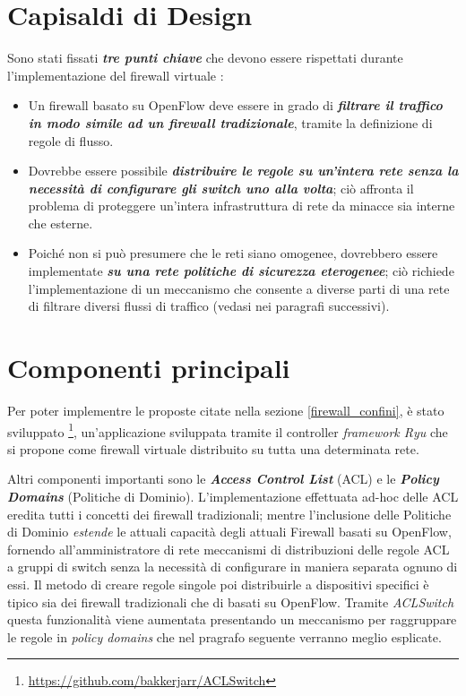 \onehalfspacing

\section{Capisaldi di Design}
Sono stati fissati \textit{\textbf{tre punti chiave}} che devono essere rispettati durante l'implementazione del firewall virtuale \cite{bakker2016network}:
\begin{itemize}
  \item Un firewall basato su OpenFlow deve essere in grado di \textit{\textbf{filtrare il traffico in modo simile ad un firewall tradizionale}}, tramite la definizione di regole di flusso.
  \item Dovrebbe essere possibile \textit{\textbf{distribuire le regole su un'intera rete senza la necessità di configurare gli switch uno alla volta}}; ciò affronta il problema di proteggere un'intera infrastruttura di rete da minacce sia interne che esterne.
  \item Poiché non si può presumere che le reti siano omogenee, dovrebbero essere implementate \textit{\textbf{su una rete politiche di sicurezza eterogenee}}; ciò richiede l'implementazione di un meccanismo che consente a diverse parti di una rete di filtrare diversi flussi di traffico (vedasi nei paragrafi successivi).
\end{itemize}

\section{Componenti principali}

Per poter implementre le proposte citate nella sezione \ref{firewall_confini}, è stato sviluppato \footnote{\url{https://github.com/bakkerjarr/ACLSwitch}}, un'applicazione sviluppata tramite il controller \textit{framework Ryu} che si propone come firewall virtuale distribuito su tutta una determinata rete.

Altri componenti importanti sono le \textit{\textbf{Access Control List}} (ACL) e le \textit{\textbf{Policy Domains}} (Politiche di Dominio). L'implementazione effettuata ad-hoc delle ACL eredita tutti i concetti dei firewall tradizionali; mentre l'inclusione delle Politiche di Dominio \textit{estende} le attuali capacità degli attuali Firewall basati su OpenFlow, fornendo all'amministratore di rete meccanismi di distribuzioni delle regole ACL a gruppi di switch senza la necessità di configurare in maniera separata ognuno di essi. Il metodo di creare regole singole poi distribuirle a dispositivi specifici è tipico sia dei firewall tradizionali che di basati su OpenFlow. Tramite \textit{ACLSwitch} questa funzionalità viene aumentata presentando un meccanismo per raggruppare le regole in \textit{policy domains} che nel pragrafo seguente verranno meglio esplicate.

